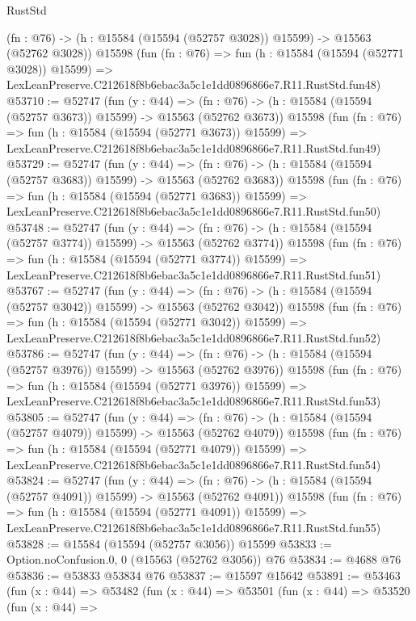 \begin{lexlean}{RustStd}
\begin{coremodule}
    (fn : @76) -> (h : @15584 (@15594 (@52757 @3028)) @15599) -> @15563 (@52762 @3028))
    @15598
    (fun (fn : @76) =>
    fun (h : @15584 (@15594 (@52771 @3028)) @15599) =>
    LexLeanPreserve.C212618f8b6ebac3a5c1e1dd0896866e7.R11.RustStd.fun48)
@53710 := @52747
    (fun (y : @44) =>
    (fn : @76) -> (h : @15584 (@15594 (@52757 @3673)) @15599) -> @15563 (@52762 @3673))
    @15598
    (fun (fn : @76) =>
    fun (h : @15584 (@15594 (@52771 @3673)) @15599) =>
    LexLeanPreserve.C212618f8b6ebac3a5c1e1dd0896866e7.R11.RustStd.fun49)
@53729 := @52747
    (fun (y : @44) =>
    (fn : @76) -> (h : @15584 (@15594 (@52757 @3683)) @15599) -> @15563 (@52762 @3683))
    @15598
    (fun (fn : @76) =>
    fun (h : @15584 (@15594 (@52771 @3683)) @15599) =>
    LexLeanPreserve.C212618f8b6ebac3a5c1e1dd0896866e7.R11.RustStd.fun50)
@53748 := @52747
    (fun (y : @44) =>
    (fn : @76) -> (h : @15584 (@15594 (@52757 @3774)) @15599) -> @15563 (@52762 @3774))
    @15598
    (fun (fn : @76) =>
    fun (h : @15584 (@15594 (@52771 @3774)) @15599) =>
    LexLeanPreserve.C212618f8b6ebac3a5c1e1dd0896866e7.R11.RustStd.fun51)
@53767 := @52747
    (fun (y : @44) =>
    (fn : @76) -> (h : @15584 (@15594 (@52757 @3042)) @15599) -> @15563 (@52762 @3042))
    @15598
    (fun (fn : @76) =>
    fun (h : @15584 (@15594 (@52771 @3042)) @15599) =>
    LexLeanPreserve.C212618f8b6ebac3a5c1e1dd0896866e7.R11.RustStd.fun52)
@53786 := @52747
    (fun (y : @44) =>
    (fn : @76) -> (h : @15584 (@15594 (@52757 @3976)) @15599) -> @15563 (@52762 @3976))
    @15598
    (fun (fn : @76) =>
    fun (h : @15584 (@15594 (@52771 @3976)) @15599) =>
    LexLeanPreserve.C212618f8b6ebac3a5c1e1dd0896866e7.R11.RustStd.fun53)
@53805 := @52747
    (fun (y : @44) =>
    (fn : @76) -> (h : @15584 (@15594 (@52757 @4079)) @15599) -> @15563 (@52762 @4079))
    @15598
    (fun (fn : @76) =>
    fun (h : @15584 (@15594 (@52771 @4079)) @15599) =>
    LexLeanPreserve.C212618f8b6ebac3a5c1e1dd0896866e7.R11.RustStd.fun54)
@53824 := @52747
    (fun (y : @44) =>
    (fn : @76) -> (h : @15584 (@15594 (@52757 @4091)) @15599) -> @15563 (@52762 @4091))
    @15598
    (fun (fn : @76) =>
    fun (h : @15584 (@15594 (@52771 @4091)) @15599) =>
    LexLeanPreserve.C212618f8b6ebac3a5c1e1dd0896866e7.R11.RustStd.fun55)
@53828 := @15584 (@15594 (@52757 @3056)) @15599
@53833 := Option.noConfusion.{0, 0} (@15563 (@52762 @3056)) @76
@53834 := @4688 @76
@53836 := @53833 @53834 @76
@53837 := @15597 @15642
@53891 := @53463
    (fun (x : @44) =>
    @53482
      (fun (x : @44) =>
      @53501
        (fun (x : @44) =>
        @53520
          (fun (x : @44) =>

\end{coremodule}
\end{lexlean}
